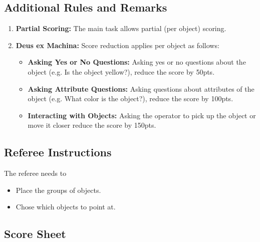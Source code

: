 \subsection*{Additional Rules and Remarks}
\begin{enumerate}[nosep]
	\item \textbf{Partial Scoring:} The main task allows partial (per object) scoring.
	
	\item \textbf{Deus ex Machina:} Score reduction applies per object as follows:
	\begin{itemize}[nosep]
		\item \textbf{Asking Yes or No Questions:} Asking yes or no questions about the object (e.g. Is the object yellow?), reduce the score by 50pts.
		\item \textbf{Asking Attribute Questions:} Asking questions about attributes of the object (e.g. What color is the object?), reduce the score by 100pts.
		\item \textbf{Interacting with Objects:} Asking the operator to pick up the object or move it closer reduce the score by 150pts.
	\end{itemize}
\end{enumerate}


\subsection*{Referee Instructions}

The referee needs to
\begin{itemize}[nosep]
	\item Place the groups of objects.
	\item Chose which objects to point at.
\end{itemize}

\subsection*{Score Sheet}



